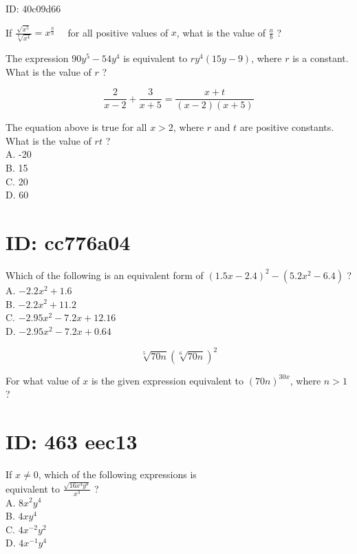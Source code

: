 ID: 40c09d66

If $\frac{\sqrt{x^{5}}}{\sqrt[3]{x^{4}}}=x^{\frac{a}{b}} \quad$ for all positive values of $x$, what is the value of $\frac{a}{b}$ ?

The expression $90 y^{5}-54 y^{4}$ is equivalent to $r y^{4}(15 y-9)$, where $r$ is a constant. What is the value of $r$ ?

$$
\frac{2}{x-2}+\frac{3}{x+5}=\frac{x+t}{(x-2)(x+5)}
$$

The equation above is true for all $x>2$, where $r$ and $t$ are positive constants. What is the value of $r t$ ?\\
A. -20\\
B. 15\\
C. 20\\
D. 60

\section*{ID: cc776a04}
Which of the following is an equivalent form of $(1.5 x-2.4)^{2}-\left(5.2 x^{2}-6.4\right)$ ?\\
A. $-2.2 x^{2}+1.6$\\
B. $-2.2 x^{2}+11.2$\\
C. $-2.95 x^{2}-7.2 x+12.16$\\
D. $-2.95 x^{2}-7.2 x+0.64$

$$
\sqrt[5]{70 n}(\sqrt[6]{70 n})^{2}
$$

For what value of $x$ is the given expression equivalent to $(70 n)^{30 x}$, where $n>1$ ?






































\section*{ID: 463 eec13}
If $x \neq 0$, which of the following expressions is\\
equivalent to $\frac{\sqrt{16 x^{4} y^{8}}}{x^{3}}$ ?\\
A. $8 x^{2} y^{4}$\\
B. $4 x y^{4}$\\
C. $4 x^{-2} y^{2}$\\
D. $4 x^{-1} y^{4}$

